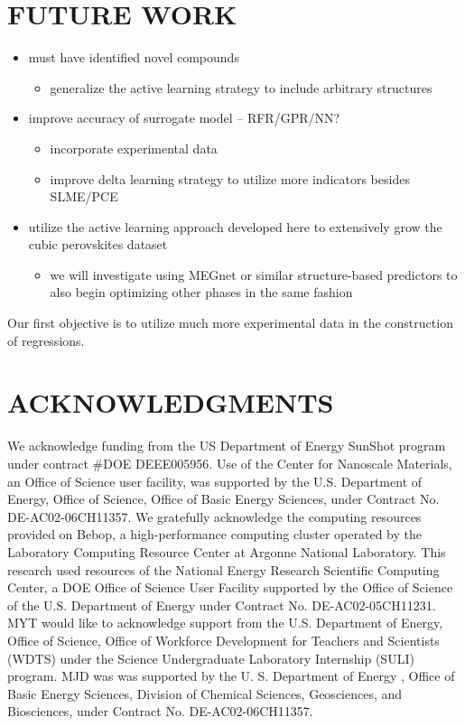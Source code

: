 \documentclass[aip, jmp, amsmath, amssymb]{revtex4-2}
\begin{document}
\section*{FUTURE WORK}
\label{sec:org5098265}
\begin{itemize}
\item must have identified novel compounds
\begin{itemize}
\item generalize the active learning strategy to include arbitrary structures
\end{itemize}
\item improve accuracy of surrogate model -- RFR/GPR/NN?
\begin{itemize}
\item incorporate experimental data \cite{jacobsson-2021-open-acces,briones-2021-accel-lattic}
\item improve delta learning strategy to utilize more indicators besides SLME/PCE
\end{itemize}
\item utilize the active learning approach developed here to extensively
grow the cubic perovskites dataset
\begin{itemize}
\item we will investigate using MEGnet or similar structure-based
predictors to also begin optimizing other phases in the same
fashion
\end{itemize}
\end{itemize}

Our first objective is to utilize much more experimental data in the
construction of regressions.
\section*{ACKNOWLEDGMENTS}
\label{sec:org79ed0a1}
We acknowledge funding from the US Department of Energy SunShot program
under contract \#DOE DEEE005956. Use of the Center for Nanoscale
Materials, an Office of Science user facility, was supported by the U.S.
Department of Energy, Office of Science, Office of Basic Energy
Sciences, under Contract No. DE-AC02-06CH11357. We gratefully
acknowledge the computing resources provided on Bebop, a
high-performance computing cluster operated by the Laboratory Computing
Resource Center at Argonne National Laboratory. This research used
resources of the National Energy Research Scientific Computing Center, a
DOE Office of Science User Facility supported by the Office of Science
of the U.S. Department of Energy under Contract No. DE-AC02-05CH11231.
MYT would like to acknowledge support from the U.S. Department of
Energy, Office of Science, Office of Workforce Development for Teachers
and Scientists (WDTS) under the Science Undergraduate Laboratory
Internship (SULI) program. MJD was was supported by the U. S. Department
of Energy , Office of Basic Energy Sciences, Division of Chemical
Sciences, Geosciences, and Biosciences, under Contract No.
DE-AC02-06CH11357.
\end{document}
